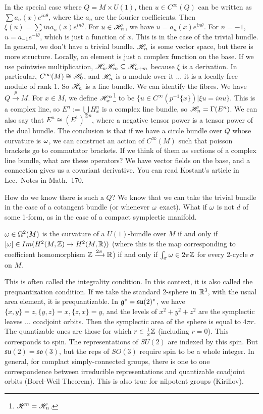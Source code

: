  In the special case where $Q=M\times U(1)$, then $u\in C^\infty(Q)$ can be written as
 $\sum a_n(x) e^{in\theta}$, where the $a_n$ are the fourier coefficients.  Then
 $\xi(u) = \sum in a_n(x)e^{in\theta}$.  For $u\in \mathscr{H}_n$, we have
 $u=a_n(x)e^{in\theta}$.  For $n=-1$, $u=a_{-1}e^{-i\theta}$, which is just a function
 of $x$.  This is in the case of the trivial bundle.  In general, we don't have a
 trivial bundle.  $\mathscr{H}_n$ is some vector space, but there is more structure.  Locally,
 an element is just a complex function on the base.  If we use pointwise
 multiplication, $\mathscr{H}_n\mathscr{H}_m\subseteq \mathscr{H}_{n+m}$ because $\xi$ is a derivation.  In
 particular, $C^\infty(M)\cong \mathscr{H}_0$, and $\mathscr{H}_n$ is a module over it ... it is a
 locally free module of rank 1.  So $\mathscr{H}_n$ is a line bundle.  We can identify the
 fibres.  We have $Q\xrightarrow{p} M$.  For $x\in M$, we define
 $\mathscr{H}^n_x$\footnote{$\mathscr{H}^n=\mathscr{H}_n$.} to be $\{u\in C^\infty(p^{-1}\{x\}) | \xi u =inu\}$.
 This is a complex line, so $E^n:=\bigcup H^n_x$ is a complex line bundle, so
 $\mathscr{H}_n=\Gamma(E^n)$.  We can also say that $E^n\cong (E^1)^{\otimes n}$, where a
 negative tensor power is a tensor power of the dual bundle.  The conclusion is that
 if we have a circle bundle over $Q$ whose curvature is $\omega$, we can construct an
 action of $C^\infty(M)$ such that poisson brackets go to commutator brackets.  If we
 think of them as sections of a complex line bundle, what are these operators?  We
 have vector fields on the base, and a connection gives us a covariant derivative.
 You can read Kostant's article in Lec.~Notes in Math.~170.

 How do we know there is such a $Q$?  We know that we can take the trivial bundle in
 the case of a cotangent bundle (or whenever $\omega$ exact).  What if $\omega$ is not $d$ of
 some 1-form, as in the case of a compact symplectic manifold.
 \begin{theorem}[A. Weil]
   $\omega\in \Omega^2(M)$ is the curvature of a $U(1)$-bundle over $M$ if and only if $[\omega]\in
   Im(H^2(M,\mathbb{Z})\to H^2(M,\mathbb{R}))$ (where this is the map corresponding to coefficient
   homomorphism $\mathbb{Z}\xrightarrow{2\pi} \mathbb{R}$) if and only if $\int_\sigma \omega \in 2\pi
   \mathbb{Z}$ for every 2-cycle $\sigma$ on $M$.
 \end{theorem}
 This is often called the integrality condition.  In this context, it is also called
 the prequantization condition.  If we take the standard 2-sphere in $\mathbb{R}^3$, with the
 usual area element, it is prequantizable.  In $\mathfrak{g}^* = \mathfrak{su}(2)^*$, we have
 $\{x,y\}=z, \{y,z\}=x, \{z,x\}=y$, and the levels of $x^2+y^2+z^2$ are the symplectic
 leaves  ... coadjoint orbits.  Then the symplectic area of the sphere is equal to
 $4\pi r$.  The quantizable ones are those for which $r\in \frac{1}{2}\mathbb{Z}$ (including
 $r=0$).  This corresponds to spin.  The representations of $SU(2)$ are indexed by
 this spin.  But $\mathfrak{su}(2)=\mathfrak{so}(3)$, but the reps of $SO(3)$ require
 spin to be a whole integer.  In general, for complact simply-connected groups, there
 is one to one correspondence between irreducible representations and quantizable
 coadjoint orbits (Borel-Weil Theorem).  This is also true for nilpotent groups
 (Kirillov).

